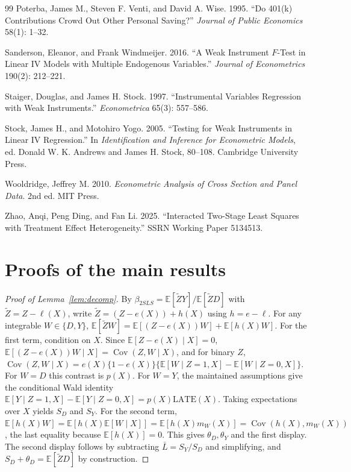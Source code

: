\documentclass[11pt]{article}
\theoremstyle{plain}
\theoremstyle{definition}
\newcommand{\E}{\mathbb{E}}
\newcommand{\Cov}{\operatorname{Cov}}
\newcommand{\Lb}{\bar{L}}
\newcommand{\Zt}{\tilde{Z}}
\begin{document}
\begin{thebibliography}{99}
 Poterba, James M., Steven F. Venti, and David A. Wise. 1995. ``Do 401(k) Contributions Crowd Out Other Personal Saving?'' \textit{Journal of Public Economics} 58(1): 1--32.

 Sanderson, Eleanor, and Frank Windmeijer. 2016. ``A Weak Instrument $F$-Test in Linear IV Models with Multiple Endogenous Variables.'' \textit{Journal of Econometrics} 190(2): 212--221.

 Staiger, Douglas, and James H. Stock. 1997. ``Instrumental Variables Regression with Weak Instruments.'' \textit{Econometrica} 65(3): 557--586.

 Stock, James H., and Motohiro Yogo. 2005. ``Testing for Weak Instruments in Linear IV Regression.'' In \textit{Identification and Inference for Econometric Models}, ed. Donald W. K. Andrews and James H. Stock, 80--108. Cambridge University Press.

 Wooldridge, Jeffrey M. 2010. \textit{Econometric Analysis of Cross Section and Panel Data}. 2nd ed. MIT Press.

 Zhao, Anqi, Peng Ding, and Fan Li. 2025. ``Interacted Two-Stage Least Squares with Treatment Effect Heterogeneity.'' SSRN Working Paper 5134513.

\end{thebibliography}

\appendix
\section{Proofs of the main results}\label{app:proofs}

\begin{proof}[Proof of Lemma~\ref{lem:decomp}]
By $\beta_{2SLS}=\E[\Zt Y]/\E[\Zt D]$ with $\Zt=Z-\ell(X)$, write $\Zt=(Z-e(X))+h(X)$ using $h=e-\ell$. For any integrable $W\in\{D,Y\}$, $\E[\Zt W]=\E[(Z-e(X))W]+\E[h(X)W]$. For the first term, condition on $X$. Since $\E[Z-e(X)\mid X]=0$, $\E[(Z-e(X))W\mid X]=\Cov(Z,W\mid X)$, and for binary $Z$, $\Cov(Z,W\mid X)=e(X)\{1-e(X)\}\{\E[W\mid Z=1,X]-\E[W\mid Z=0,X]\}$. For $W=D$ this contrast is $p(X)$. For $W=Y$, the maintained assumptions give the conditional Wald identity $\E[Y\mid Z=1,X]-\E[Y\mid Z=0,X]=p(X)\mathrm{LATE}(X)$. Taking expectations over $X$ yields $S_D$ and $S_Y$. For the second term, $\E[h(X)W]=\E[h(X)\E[W\mid X]]=\E[h(X)m_W(X)]=\Cov(h(X),m_W(X))$, the last equality because $\E[h(X)]=0$. This gives $\theta_D,\theta_Y$ and the first display. The second display follows by subtracting $\Lb=S_Y/S_D$ and simplifying, and $S_D+\theta_D=\E[\Zt D]$ by construction.
\end{proof}
\end{document}
